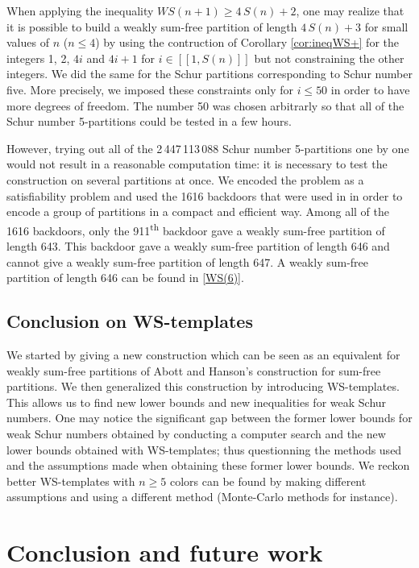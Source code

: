 \documentclass[final,onefignum,onetabnum]{siamart190516}
\newcommand{\WS}{\mathit{WS}}
\begin{document}
When applying the inequality \(\WS(n+1) \geqslant 4 \, S(n) + 2\), one may realize that it is possible to build a weakly 
sum-free partition of length \(4 \, S(n) + 3\) for small values of \(n\) (\(n \leqslant 4\)) by using the contruction of 
Corollary \ref{cor:ineqWS+} for the integers 1, 2, \(4i\) and \(4i+1\) for \(i \in [\![1, S(n)]\!]\) but not 
constraining the other integers. We did the same for the Schur partitions corresponding to Schur number five. More precisely, 
we imposed these constraints only for \(i \leqslant 50\) in order to have more degrees of freedom. The number 50 was chosen 
arbitrarly so that all of the Schur number 5-partitions could be tested in a few hours.

However, trying out all of the 2\,447\,113\,088 Schur number 5-partitions \cite{Heule2017} one by one would not result in a 
reasonable computation time: it is necessary to test the construction on several partitions at once. We encoded the problem as a 
satisfiability problem and used the 1616 backdoors that were used in \cite{Heule2017} in order to encode a group of partitions in 
a compact and efficient way. Among all of the 1616 backdoors, only the 911\textsuperscript{th} backdoor gave a weakly sum-free 
partition of length 643. This backdoor gave a weakly sum-free partition of length 646 and cannot give a weakly sum-free 
partition of length 647. A weakly sum-free partition of length 646 can be found in \ref{WS(6)}.


\subsection{Conclusion on WS-templates}

We started by giving a new construction which can be seen as an equivalent for weakly sum-free partitions of Abott
and Hanson's construction for sum-free partitions. We then generalized this construction by introducing WS-templates. This
allows us to find new lower bounds and new inequalities for weak Schur numbers. One may notice the significant gap
between the former lower bounds for weak Schur numbers obtained by conducting a computer search and the new lower bounds
obtained with WS-templates; thus questionning the methods used and the assumptions made when obtaining these former lower 
bounds. We reckon better WS-templates with \(n \geqslant 5\) colors can be found by making different assumptions 
and using a different method (Monte-Carlo methods for instance).


\section{Conclusion and future work}
\end{document}
